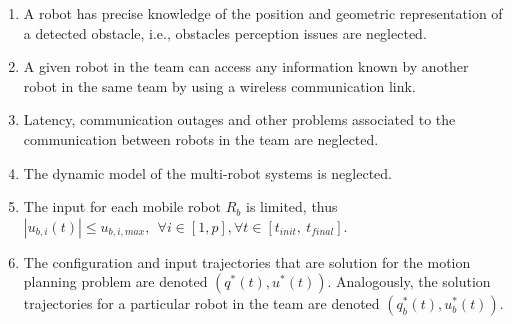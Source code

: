 \begin{enumerate}
    \item A robot has precise knowledge of the position and geometric 
    representation of a detected obstacle, i.e., obstacles perception issues
    are neglected.
    
    \item A given robot in the team can access 
    any information known by another robot in the same team by using 
    a wireless communication link.
    
    \item Latency, communication outages and other problems associated
    to the communication between robots in the team are neglected.
        
    \item The dynamic model of the multi-robot systems is neglected.
    
    \item The input for each mobile robot $R_b$ is limited, thus $|u_{b,i}(t)| \leq u_{b,i,max},\ \ \forall i \in [1,p],\forall t \in [t_{init},\ t_{final}]$.
    
    \item The configuration and input trajectories that are solution for the motion planning problem are denoted $(q^{*}(t), u^{*}(t))$. Analogously, the solution trajectories for a particular robot in the team are denoted $(q_b^{*}(t), u_b^{*}(t))$.
    

%    

\end{enumerate}

